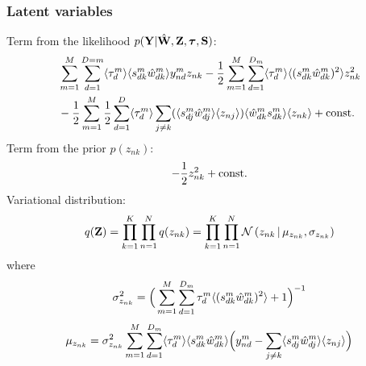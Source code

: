 \documentclass[10pt, a4paper,openany]{report}
\begin{document}
\subsubsection*{Latent variables}
Term from the likelihood $p({\bf Y}|\hat{{\bf W}},{\bf Z},\mbox{\boldmath $\tau$},{\bf S})$:
\begin{align*}
&\sum_{m=1}^{M} \sum_{d=1}^{D=m} \langle\tau_d^m\rangle \langle s_{dk}^m \hat{w}_{dk}^m \rangle y_{nd}^m z_{nk}
-\frac{1}{2}\sum_{m=1}^{M} \sum_{d=1}^{D_m} \langle\tau_d^m\rangle \langle (s_{dk}^m\hat{w}_{dk}^m)^2 \rangle z_{nk}^2 \\
&-\frac{1}{2}\sum_{m=1}^{M} \frac{1}{2}\sum_{d=1}^{D} \langle\tau_d^m\rangle \sum_{j \neq k} (\langle s_{dj}^m \hat{w}^m_{dj} \rangle \langle z_{nj} \rangle) \langle\hat{w}^m_{dk} s_{dk}^m \rangle \langle z_{nk} \rangle + {\rm const.}
\end{align*}
Term from the prior $p(z_{nk})$:
\[
-\frac{1}{2} z_{nk}^2 + {\rm const.}
\]
Variational distribution:
\[
q({\bf Z}) = \prod_{k=1}^{K} \prod_{n=1}^{N} q(z_{nk}) = \prod_{k=1}^{K} \prod_{n=1}^{N} \mathcal{N}\left(z_{nk} \,|\, \mu_{z_{nk}},\sigma_{z_{nk}}\right)
\]
where
\[
\sigma_{z_{nk}}^2 = \Big( \sum_{m=1}^{M} \sum_{d=1}^{D_m} \tau_d^m \langle (s_{dk}^m\hat{w}_{dk}^m)^2 \rangle + 1 \Big)^{-1}
\]
\[
\mu_{z_{nk}} = \sigma_{z_{nk}}^2 \sum_{m=1}^{M} \sum_{d=1}^{D_m} \langle\tau_d^m\rangle \langle s_{dk}^m\hat{w}_{dk}^m \rangle \Big( y_{nd}^m - \sum_{j \neq k} \langle s_{dj}^m \hat{w}_{dj}^m \rangle \langle z_{nj} \rangle \Big)
\]
\end{document}
